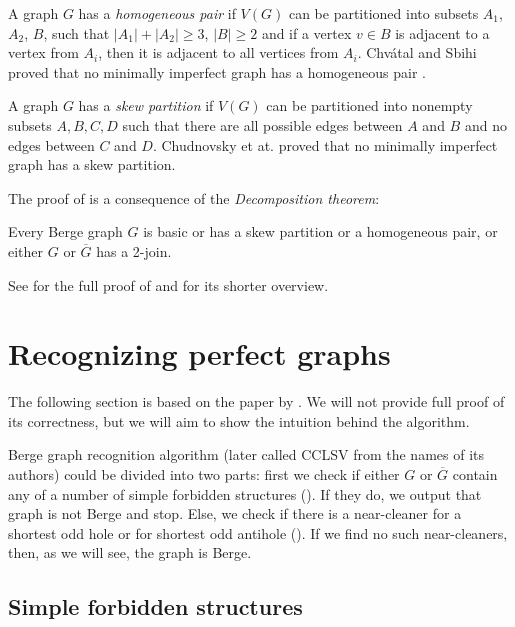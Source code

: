 A graph $G$ has a \emph{homogeneous pair} if $V(G)$ can be partitioned into subsets $A_1$, $A_2$, $B$, such that $|A_1|+|A_2| \geq 3$, $|B| \geq 2$ and if a vertex $v \in B$ is adjacent to a vertex from $A_i$, then it is adjacent to all vertices from $A_i$. Chvátal and Sbihi proved that no minimally imperfect graph has a homogeneous pair \cite{Chvtal1987}.

A graph $G$ has a \emph{skew partition} if $V(G)$ can be partitioned into nonempty subsets $A, B, C, D$ such that there are all possible edges between $A$ and $B$ and no edges between $C$ and $D$. Chudnovsky et at. proved that no minimally imperfect graph has a skew partition.

The proof of  is a consequence of the \emph{Decomposition theorem}:

\begin{theorem}
	\label{thm:decomposition}
	Every Berge graph $G$ is basic or has a skew partition or a homogeneous pair, or either $G$ or $\overline{G}$ has a 2-join.
\end{theorem}

See \cite{MC06} for the full proof of  and \cite{GC03} for its shorter overview.

\section{Recognizing perfect graphs}
\label{sec:recognizingBerge}

The following section is based on the paper by \citeauthor{MC05}  \cite{MC05}. We will not provide full proof of its correctness, but we will aim to show the intuition behind the algorithm.

Berge graph recognition algorithm (later called CCLSV from the names of its authors) could be divided into two parts: first we check if either $G$ or $\overline{G}$ contain any of a number of simple forbidden structures (). If they do, we output that graph is not Berge and stop. Else, we check if there is a near-cleaner for a shortest odd hole or for shortest odd antihole (). If we find no such near-cleaners, then, as we will see, the graph is Berge.

\subsection{Simple forbidden structures}
\label{SimpleStructures}


